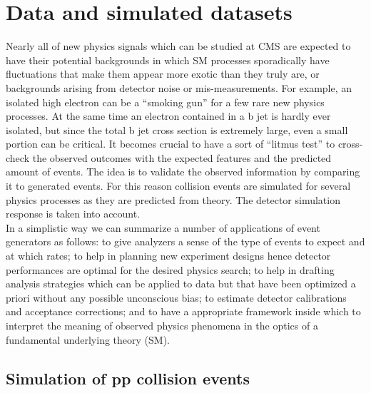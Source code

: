 \chapter{Data and simulated datasets} \label{Chapter4} 


Nearly all of new physics signals which can be studied at CMS are
expected to have their potential backgrounds in which SM
processes sporadically have fluctuations that make them appear more
exotic than they truly are, or backgrounds arising from detector noise
or mis-measurements.
For example, an isolated high \pt electron can be a ``smoking gun'' for
a few rare new physics processes. At the same time an electron contained in a b
jet is hardly ever isolated, but since the total b jet cross section
is extremely large, even a small portion can be critical. It becomes
crucial to have a sort of ``litmus test'' to cross-check the observed
outcomes with the expected features and the predicted amount of events.
The idea is to validate the observed information by comparing it to
generated events. For this reason collision events are simulated for
several physics processes as they are predicted from theory. The
detector simulation response is taken into account. \\
In a simplistic way we can summarize a number of applications of event
generators as follows: to give analyzers a sense of the type of
events to expect and at which rates; to help in planning new
experiment designs hence detector performances are optimal for the
desired physics search; to help in drafting analysis strategies which
can be applied to data but that have been optimized a priori without
any possible unconscious bias; to estimate detector calibrations and acceptance
corrections; and to have a appropriate framework inside which to
interpret the meaning of observed physics phenomena in the optics of a
fundamental underlying theory (SM).



\section{Simulation of pp collision events}\label{sec:c4eventsimulation}

